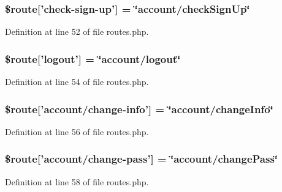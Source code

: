 \hypertarget{routes_8php_aed782d27d10fc156cc2bfd21da5f511b}{
\subsubsection[{\$route}]{\setlength{\rightskip}{0pt plus 5cm}\$route\mbox{[}'check-\/sign-\/up'\mbox{]} = \char`\"{}account/check\-Sign\-Up\char`\"{}}}\label{routes_8php_aed782d27d10fc156cc2bfd21da5f511b}


Definition at line 52 of file routes.\-php.

\hypertarget{routes_8php_a1d3e833786c5b494a7e64bd90543ff54}{
\subsubsection[{\$route}]{\setlength{\rightskip}{0pt plus 5cm}\$route\mbox{[}'logout'\mbox{]} = \char`\"{}account/logout\char`\"{}}}\label{routes_8php_a1d3e833786c5b494a7e64bd90543ff54}


Definition at line 54 of file routes.\-php.

\hypertarget{routes_8php_a456226c2c4c89e963ae1f7a39c05f664}{
\subsubsection[{\$route}]{\setlength{\rightskip}{0pt plus 5cm}\$route\mbox{[}'account/change-\/info'\mbox{]} = \char`\"{}account/change\-Info\char`\"{}}}\label{routes_8php_a456226c2c4c89e963ae1f7a39c05f664}


Definition at line 56 of file routes.\-php.

\hypertarget{routes_8php_a1f1cca6f261ccaa1eeae697a8e61b43f}{
\subsubsection[{\$route}]{\setlength{\rightskip}{0pt plus 5cm}\$route\mbox{[}'account/change-\/pass'\mbox{]} = \char`\"{}account/change\-Pass\char`\"{}}}\label{routes_8php_a1f1cca6f261ccaa1eeae697a8e61b43f}


Definition at line 58 of file routes.\-php.

